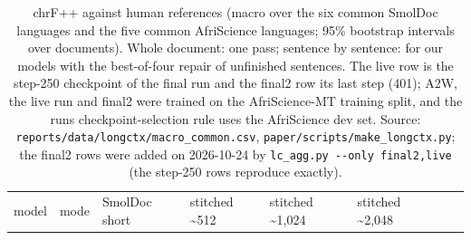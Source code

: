 \begin{table}[t]
\centering
\footnotesize
\setlength{\tabcolsep}{3pt}
\caption{chrF++ against human references (macro over the six common SmolDoc languages and the five common AfriScience languages; 95\% bootstrap intervals over documents). Whole document: one pass; sentence by sentence: for our models with the best-of-four repair of unfinished sentences. The live row is the step-250 checkpoint of the final run and the final2 row its last step (401); A2W, the live run and final2 were trained on the AfriScience-MT training split, and the run\textquotesingle s checkpoint-selection rule uses the AfriScience dev set. Source: \texttt{reports/data/longctx/macro\_common.csv}, \texttt{paper/scripts/make\_longctx.py}; the final2 rows were added on 2026-10-24 by \texttt{lc\_agg.py\ -\/-only\ final2,live} (the step-250 rows reproduce exactly).}
\label{tab:t_longctx_human_chrf}
{\def\LTcaptype{none} %
\begin{tabular}{@{}
  >{\raggedright\arraybackslash}p{}
  >{\raggedleft\arraybackslash}p{}
  >{\raggedleft\arraybackslash}p{}
  >{\raggedleft\arraybackslash}p{}
  >{\raggedleft\arraybackslash}p{}
  >{\raggedleft\arraybackslash}p{}
  >{\raggedleft\arraybackslash}p{}
  >{\raggedleft\arraybackslash}p{}@{}}
\toprule
\begin{minipage}[b]{\linewidth}\raggedright
model
\end{minipage} & \begin{minipage}[b]{\linewidth}\raggedleft
mode
\end{minipage} & \begin{minipage}[b]{\linewidth}\raggedleft
SmolDoc short
\end{minipage} & \begin{minipage}[b]{\linewidth}\raggedleft
stitched \textasciitilde512
\end{minipage} & \begin{minipage}[b]{\linewidth}\raggedleft
stitched \textasciitilde1,024
\end{minipage} & \begin{minipage}[b]{\linewidth}\raggedleft
stitched \textasciitilde2,048
\end{minipage} & \begin{minipage}[b]{\linewidth}\raggedleft

\end{minipage}
\end{tabular}}
\end{table}
